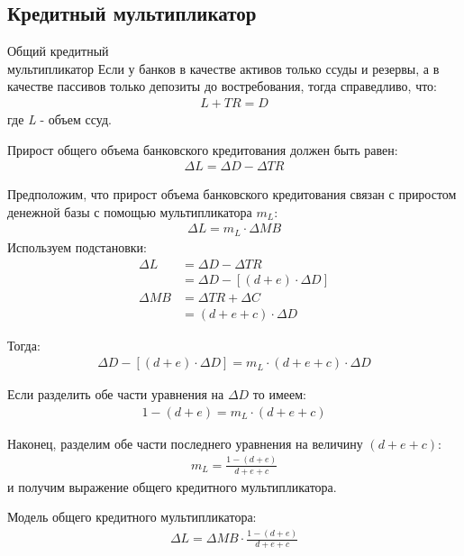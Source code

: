 \documentclass[_DKB_p1_Money.tex]{subfiles}
\begin{document}
\subsection{Кредитный мультипликатор}
\begin{frame}[allowframebreaks]{Общий кредитный\\ мультипликатор}
Если у банков в качестве активов только ссуды и резервы, а в качестве пассивов только депозиты до востребования, тогда справедливо, что:
\begin{align}
L+TR=D
\end{align}
где
\textit{L} - объем ссуд.

Прирост общего объема банковского кредитования должен быть равен:
\begin{align}
\Delta L = \Delta D - \Delta TR
\end{align}

\pagebreak
Предположим, что прирост объема банковского кредитования связан с приростом денежной базы с помощью мультипликатора $m_L$:
\begin{align}
\Delta L = m_L \cdot \Delta MB
\end{align}
Используем подстановки:
\begin{align}
\Delta L &= \Delta D - \Delta TR \nonumber\\
&= \Delta D - [(d+e) \cdot \Delta D] \nonumber\\
\Delta MB &= \Delta TR + \Delta C \nonumber\\
&= (d+e+c) \cdot \Delta D
\end{align}

\pagebreak
Тогда:
\begin{align}
\Delta D - [(d+e)\cdot \Delta D]=m_L \cdot (d+e+c) \cdot \Delta D
\end{align}

Если разделить обе части уравнения на $\Delta D$ то имеем:
\begin{align}
1-(d+e)=m_L \cdot (d+e+c)
\end{align}

\pagebreak
Наконец, разделим обе части последнего уравнения на величину $(d+e+c)$:
\begin{align}
m_L=\frac{1-(d+e)}{d+e+c}
\end{align}
и получим выражение общего кредитного мультипликатора. 

\pagebreak
Модель общего кредитного мультипликатора:
\begin{align}
\Delta L=\Delta MB \cdot \frac{1-(d+e)}{d+e+c}
\end{align}

\end{frame}
\end{document}
